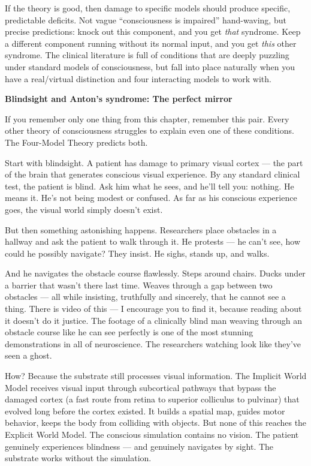\documentclass[11pt, twoside, openright]{book}
\begin{document}
If the theory is good, then damage to specific models should produce specific, predictable deficits. Not vague ``consciousness is impaired'' hand-waving, but precise predictions: knock out this component, and you get \textit{that} syndrome. Keep a different component running without its normal input, and you get \textit{this} other syndrome. The clinical literature is full of conditions that are deeply puzzling under standard models of consciousness, but fall into place naturally when you have a real/\allowbreak{}virtual distinction and four interacting models to work with.

\textbf{Blindsight and Anton's syndrome: The perfect mirror}

If you remember only one thing from this chapter, remember this pair. Every other theory of consciousness struggles to explain even one of these conditions. The Four-Model Theory predicts both.

Start with blindsight. A patient has damage to primary visual cortex --- the part of the brain that generates conscious visual experience. By any standard clinical test, the patient is blind. Ask him what he sees, and he'll tell you: nothing. He means it. He's not being modest or confused. As far as his conscious experience goes, the visual world simply doesn't exist.

But then something astonishing happens. Researchers place obstacles in a hallway and ask the patient to walk through it. He protests --- he can't see, how could he possibly navigate? They insist. He sighs, stands up, and walks.

And he navigates the obstacle course flawlessly. Steps around chairs. Ducks under a barrier that wasn't there last time. Weaves through a gap between two obstacles --- all while insisting, truthfully and sincerely, that he cannot see a thing. There is video of this --- I encourage you to find it, because reading about it doesn't do it justice. The footage of a clinically blind man weaving through an obstacle course like he can see perfectly is one of the most stunning demonstrations in all of neuroscience. The researchers watching look like they've seen a ghost.

How? Because the substrate still processes visual information. The Implicit World Model receives visual input through subcortical pathways that bypass the damaged cortex (a fast route from retina to superior colliculus to pulvinar) that evolved long before the cortex existed. It builds a spatial map, guides motor behavior, keeps the body from colliding with objects. But none of this reaches the Explicit World Model. The conscious simulation contains no vision. The patient genuinely experiences blindness --- and genuinely navigates by sight. The substrate works without the simulation.
\end{document}
